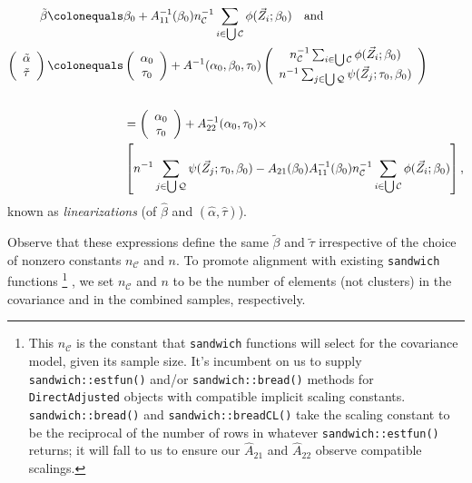\documentclass{article}
\newcommand{\defeq}{\ensuremath{\colonequals}}
\begin{document}
  \begin{align*}
   \tilde\beta
    \defeq& \beta_{0} + A_{11}^{-1}(\beta_{0})n_{\mathcal{C}}^{-1}\sum_{i\in \bigcup \mathcal{C}}\phi(\vec{Z}_{i}; \beta_{0})
  \quad \text{and}\\
    \left(\begin{array}{c}\tilde\alpha\\ \tilde\tau \end{array}\right)
    \defeq& \left(\begin{array}{c}\alpha_{0}\\
                    \tau_{0} \end{array}\right)
    + A^{-1}(\alpha_{0}, \beta_{0}, \tau_{0})\left(
    \begin{array}{c}
      n_{\mathcal{C}}^{-1}\sum_{i\in \bigcup
      \mathcal{C}}\phi(\vec{Z}_{i}; \beta_{0})\\
      n^{-1}\sum_{j\in \bigcup
                 \mathcal{Q}}\psi(\vec{Z}_{j};
                 \tau_{0},\beta_{0} )
    \end{array}
\right)\\
    \\
               &=\left(\begin{array}{c}\alpha_{0}\\
                         \tau_{0} \end{array}\right) +
    A_{22}^{-1}(\alpha_{0}, \tau_{0})\times \\
    & \left[
                 n^{-1}\sum_{j\in \bigcup
                 \mathcal{Q}}\psi(\vec{Z}_{j};
                 \tau_{0},\beta_{0} ) - A_{21}(\beta_{0}) A_{11}^{-1}(\beta_{0})n_{\mathcal{C}}^{-1}\sum_{i\in \bigcup \mathcal{C}}\phi(\vec{Z}_{i}; \beta_{0})\right],
\end{align*}
known as \textit{linearizations} (of $\hat\beta$ and $(\hat\alpha, \hat\tau)$).


Observe that these expressions define the same $\tilde\beta$ and $\tilde\tau$
  irrespective of the choice of nonzero constants $n_{\mathcal{C}}$
  and $n$.  To promote alignment with existing \texttt{sandwich}
  functions%
  \footnote{%
    This $n_{\mathcal{C}}$ is the constant that \texttt{sandwich} functions
will select for the covariance model, given its sample size.  It's
incumbent on us to supply \texttt{sandwich::estfun()} and/or
\texttt{sandwich::bread()} methods for \texttt{DirectAdjusted} objects
with compatible implicit
scaling constants. \texttt{sandwich::bread()} and
\texttt{sandwich::breadCL()} take the scaling constant to be the
reciprocal of the number of rows in whatever
\texttt{sandwich::estfun()} returns; it will fall to us to ensure our
$\hat{A}_{21}$ and $\hat{A}_{22}$ observe compatible scalings.}%
, we set $n_{\mathcal{C}}$ and $n$ to be the number of elements
(not clusters) in the covariance and in the combined samples,
respectively.
\end{document}

